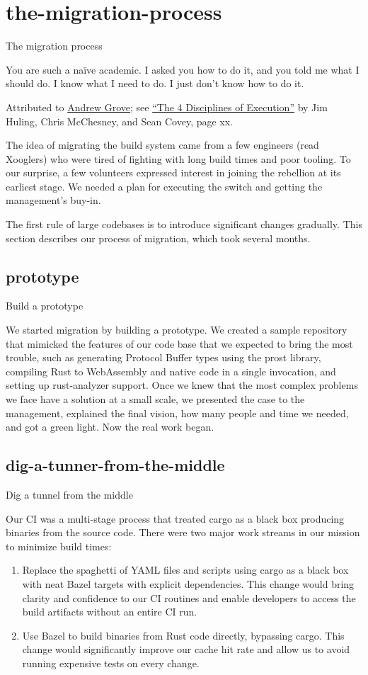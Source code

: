\documentclass{article}
\begin{document}
\section{the-migration-process}{The migration process}
\epigraph{
    You are such a naïve academic. I asked you how to do it, and you told me what I should do. I know what I need to do. I just don't know how to do it.
}{Attributed to \href{https://en.wikipedia.org/wiki/Andrew_Grove}{Andrew Grove}; see \href{https://www.amazon.com/Disciplines-Execution-Achieving-Wildly-Important/dp/1491517751}{``The 4 Disciplines of Execution''} by Jim Huling, Chris McChesney, and Sean Covey, page xx.}

The idea of migrating the build system came from a few engineers (read Xooglers) who were tired of fighting with long build times and poor tooling.
To our surprise, a few volunteers expressed interest in joining the rebellion at its earliest stage.
We needed a plan for executing the switch and getting the management's buy-in.

The first rule of large codebases is to introduce significant changes gradually. This section describes our process of migration, which took several months.

\subsection{prototype}{Build a prototype}

We started migration by building a prototype.
We created a sample repository that mimicked the features of our code base that we expected to bring the most trouble, such as generating Protocol Buffer types using the prost library, compiling Rust to WebAssembly and native code in a single invocation, and setting up rust-analyzer support.
Once we knew that the most complex problems we face have a solution at a small scale, we presented the case to the management, explained the final vision, how many people and time we needed, and got a green light.
Now the real work began.

\subsection{dig-a-tunner-from-the-middle}{Dig a tunnel from the middle}

Our CI was a multi-stage process that treated cargo as a black box producing binaries from the source code.
There were two major work streams in our mission to minimize build times:
\begin{enumerate}
  \item 
    Replace the spaghetti of YAML files and scripts using cargo as a black box with neat Bazel targets with explicit dependencies.
    This change would bring clarity and confidence to our CI routines and enable developers to access the build artifacts without an entire CI run.
  \item 
    Use Bazel to build binaries from Rust code directly, bypassing cargo.
    This change would significantly improve our cache hit rate and allow us to avoid running expensive tests on every change.
\end{enumerate}
\end{document}

